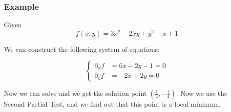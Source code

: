 \documentclass [12 pt, twoside] {book}
\newcommand\+{\text{ }}
\begin{document}
\subsubsection{Example}
Given 
$$f(x, y) = 3x^2 - 2xy + y^2 - x + 1$$

We can construct the following system of equations:

\[
    \begin{cases}
        \partial_x f &= 6x - 2y - 1 = 0\\
        \partial_y f &= -2x + 2y = 0
    \end{cases}
\]

Now we can solve and we get the solution point $(\frac{1}{4}, -\frac{1}{4})$.
Now we use the Second Partial Test, and we find out that this point is a local
minimum.
\end{document}
